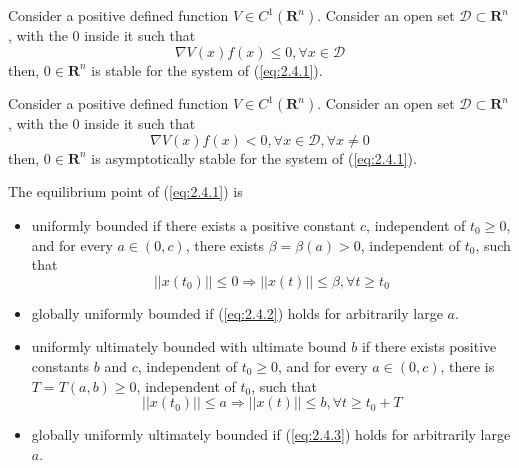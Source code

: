     \begin{theorem}\label{thr:2.4}
        \cite{HK2001} Consider a positive defined function $V \in C^1(\mathbf{R}^n)$. Consider an open set $\mathcal{D} \subset \mathbf{R}^n$, with the $0$ inside it such that
        \begin{equation*}
            \nabla V(x) f(x)\leq 0, \forall x \in \mathcal{D}
        \end{equation*}
        then, $0 \in \mathbf{R}^n$ is stable for the system of (\ref{eq:2.4.1}).
    \end{theorem}
    
    
    \begin{theorem}\label{thr:2.5}
        \cite{HK2001} Consider a positive defined function $V \in C^1(\mathbf{R}^n)$. Consider an open set $\mathcal{D} \subset \mathbf{R}^n$, with the $0$ inside it such that
        \begin{equation*}
            \nabla V(x) f(x) < 0, \forall x \in \mathcal{D}, \forall x \neq 0
        \end{equation*}
        then, $0 \in \mathbf{R}^n$ is asymptotically stable for the system of (\ref{eq:2.4.1}).
    \end{theorem}
    
    \begin{definition}\label{def:2.32}
        \cite{HK2001} The equilibrium point of (\ref{eq:2.4.1}) is
        \begin{itemize}
            \item uniformly bounded if there exists a positive constant $c$, independent of $t_0 \geq 0$, and for every $a \in (0,c)$, there exists $\beta = \beta(a) > 0$, independent of $t_0$, such that
            \begin{equation}\label{eq:2.4.2}
                ||x(t_0)|| \leq 0 \Rightarrow ||x(t)|| \leq \beta, \forall t \geq t_0
            \end{equation}
            \item globally uniformly bounded if (\ref{eq:2.4.2}) holds for arbitrarily large $a$.
            \item uniformly ultimately bounded with ultimate bound $b$ if there exists positive constants $b$ and $c$, independent of $t_0 \geq 0$, and for every $a \in (0,c)$, there is $T = T(a,b) \geq 0$, independent of $t_0$, such that
            \begin{equation}\label{eq:2.4.3}
                ||x(t_0)|| \leq a \Rightarrow ||x(t)|| \leq b, \forall t \geq t_0 + T
            \end{equation}
            \item globally uniformly ultimately bounded if (\ref{eq:2.4.3}) holds for arbitrarily large $a$.
        \end{itemize}
    \end{definition}
    

